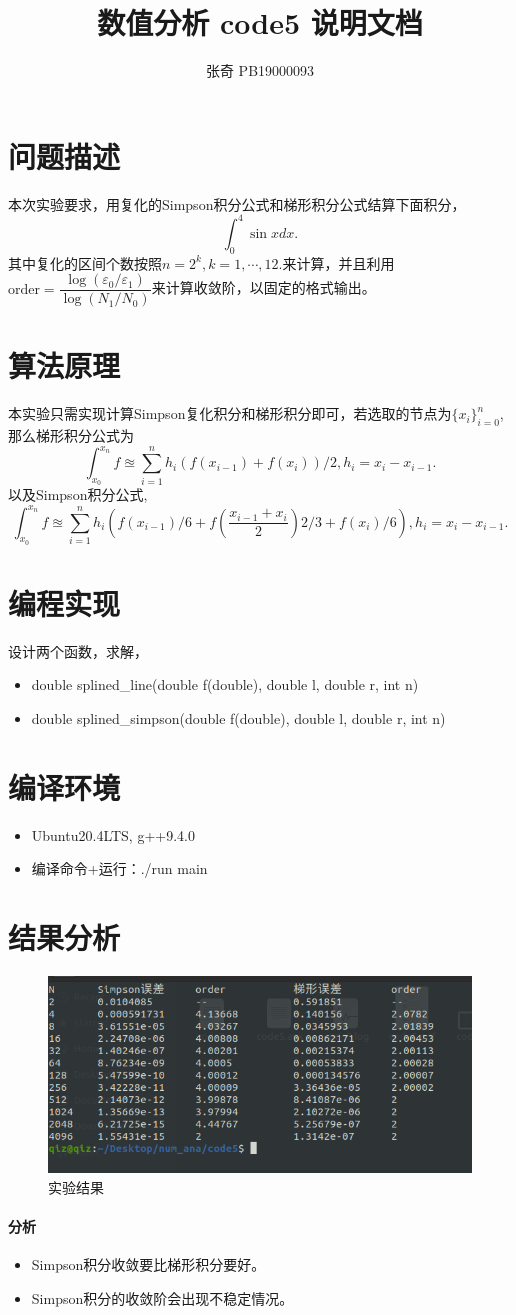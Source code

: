 \documentclass{article}
\author{张奇 PB19000093}
\title{数值分析 code5 说明文档}
\begin{document}
\begin{CJK}{UTF8}{gbsn}
	\maketitle
	\section{问题描述}
		本次实验要求，用复化的Simpson积分公式和梯形积分公式结算下面积分，
		\[\int_{0}^{4} \sin x d x . \]
		其中复化的区间个数按照$n=2^k, k=1,\cdots,12.$来计算，并且利用 
		$\mbox{order} = \dfrac{\log(\varepsilon_0/\varepsilon_1)}{\log(N_1/N_0)}$来计算收敛阶，以固定的格式输出。
	\section{算法原理}
		本实验只需实现计算Simpson复化积分和梯形积分即可，若选取的节点为$\{x_i\}_{i=0}^n$,那么梯形积分公式为
		\[\int_{x_0}^{x_n} f \approxeq \sum_{i=1}^{n} h_i (f(x_{i-1}) + f(x_{i}))/2, h_i = x_i-x_{i-1}.\]
		以及Simpson积分公式,
		\[\int_{x_0}^{x_n} f \approxeq \sum_{i=1}^{n} h_i (f(x_{i-1})/6 + f( \frac{x_{i-1}+x_i}{2} )2/3 + f(x_{i})/6), h_i = x_i-x_{i-1}.\]
	\section{编程实现}
	设计两个函数，求解，
	\begin{itemize}
		\item  double splined\_line(double f(double), double l, double r, int n)
		\item double splined\_simpson(double f(double), double l, double r, int n)
	\end{itemize}
	\section{编译环境}
	\begin{itemize}
		\item Ubuntu20.4LTS, g++9.4.0
		\item 编译命令+运行：./run main
	\end{itemize}
	\section{结果分析}
	\begin{figure}[hbpt]
		\centering
		\includegraphics[width = 0.6\linewidth]{code5.png}
		\caption{实验结果}
	\end{figure}
	\paragraph{分析}
	\begin{itemize}
		\item Simpson积分收敛要比梯形积分要好。
		\item Simpson积分的收敛阶会出现不稳定情况。
	\end{itemize}
\end{CJK}
\end{document}
